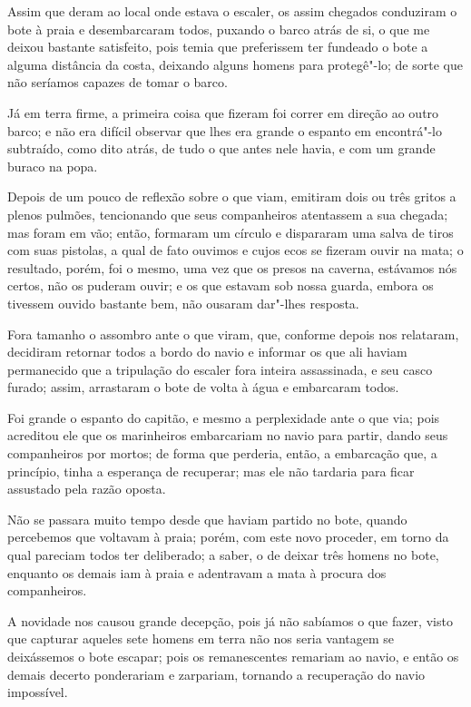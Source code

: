 Assim que deram ao local onde estava o escaler, os assim chegados
conduziram o bote à praia e desembarcaram todos, puxando o barco atrás
de si, o que me deixou bastante satisfeito, pois temia que preferissem
ter fundeado o bote a alguma distância da costa, deixando alguns homens
para protegê"-lo; de sorte que não seríamos capazes de tomar o barco.

Já em terra firme, a primeira coisa que fizeram foi correr em direção ao
outro barco; e não era difícil observar que lhes era grande o espanto em
encontrá"-lo subtraído, como dito atrás, de tudo o que antes nele havia,
e com um grande buraco na popa.

Depois de um pouco de reflexão sobre o que viam, emitiram dois ou três
gritos a plenos pulmões, tencionando que seus companheiros atentassem a
sua chegada; mas foram em vão; então, formaram um círculo e dispararam
uma salva de tiros com suas pistolas, a qual de fato ouvimos e cujos
ecos se fizeram ouvir na mata; o resultado, porém, foi o mesmo, uma vez
que os presos na caverna, estávamos nós certos, não os puderam ouvir; e
os que estavam sob nossa guarda, embora os tivessem ouvido bastante bem,
não ousaram dar"-lhes resposta.

Fora tamanho o assombro ante o que viram, que, conforme depois nos
relataram, decidiram retornar todos a bordo do navio e informar os que
ali haviam permanecido que a tripulação do escaler fora inteira
assassinada, e seu casco furado; assim, arrastaram o bote de volta à
água e embarcaram todos.

Foi grande o espanto do capitão, e mesmo a perplexidade ante o que via;
pois acreditou ele que os marinheiros embarcariam no navio para partir,
dando seus companheiros por mortos; de forma que perderia, então, a
embarcação que, a princípio, tinha a esperança de recuperar; mas ele não
tardaria para ficar assustado pela razão oposta.

Não se passara muito tempo desde que haviam partido no bote, quando
percebemos que voltavam à praia; porém, com este novo proceder, em torno
da qual pareciam todos ter deliberado; a saber, o de deixar três homens
no bote, enquanto os demais iam à praia e adentravam a mata à procura
dos companheiros.

A novidade nos causou grande decepção, pois já não sabíamos o que fazer,
visto que capturar aqueles sete homens em terra não nos seria vantagem
se deixássemos o bote escapar; pois os remanescentes remariam ao navio,
e então os demais decerto ponderariam e zarpariam, tornando a
recuperação do navio impossível.

